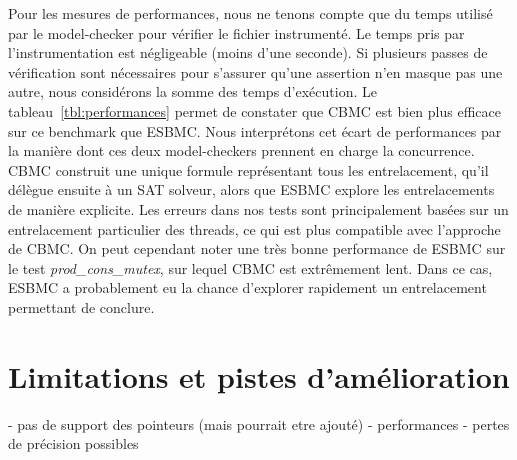 Pour les mesures de performances, nous ne tenons compte que du temps utilisé par
le model-checker pour vérifier le fichier instrumenté. Le temps pris par
l'instrumentation est négligeable (moins d'une seconde). Si plusieurs passes de
vérification sont nécessaires pour s'assurer qu'une assertion n'en masque pas
une autre, nous considérons la somme des temps d'exécution. Le
tableau~\ref{tbl:performances} permet de constater que CBMC est bien plus
efficace sur ce benchmark que ESBMC. Nous interprétons cet écart de performances
par la manière dont ces deux model-checkers prennent en charge la concurrence.
CBMC construit une unique formule représentant tous les entrelacement, qu'il
délègue ensuite à un SAT solveur, alors que ESBMC explore les entrelacements de
manière explicite. Les erreurs dans nos tests sont principalement basées sur un
entrelacement particulier des threads, ce qui est plus compatible avec
l'approche de CBMC. On peut cependant noter une très bonne performance de ESBMC
sur le test \emph{prod_cons_mutex}, sur lequel CBMC est extrêmement lent. Dans
ce cas, ESBMC a probablement eu la chance d'explorer rapidement un entrelacement
permettant de conclure.


\section{Limitations et pistes d'amélioration}

- pas de support des pointeurs (mais pourrait etre ajouté)
- performances
- pertes de précision possibles